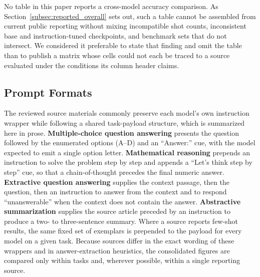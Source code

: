 No table in this paper reports a cross-model accuracy comparison. As
Section~\ref{subsec:reported_overall} sets out, such a table cannot be assembled
from current public reporting without mixing incompatible shot counts,
inconsistent base and instruction-tuned checkpoints, and benchmark sets that do
not intersect. We considered it preferable to state that finding and omit the
table than to publish a matrix whose cells could not each be traced to a source
evaluated under the conditions its column header claims.

\subsection{Prompt Formats}
\label{subsec:appendix_prompt_templates}
The reviewed source materials commonly preserve each model's own instruction
wrapper while following a shared task-payload structure, which is summarized here
in prose. \textbf{Multiple-choice question answering} presents the question
followed by the enumerated options (A--D) and an ``Answer:'' cue, with the model
expected to emit a single option letter. \textbf{Mathematical reasoning} prepends
an instruction to solve the problem step by step and appends a ``Let's think step
by step'' cue, so that a chain-of-thought precedes the final numeric answer.
\textbf{Extractive question answering} supplies the context passage, then the
question, then an instruction to answer from the context and to respond
``unanswerable'' when the context does not contain the answer. \textbf{Abstractive
summarization} supplies the source article preceded by an instruction to produce a
two- to three-sentence summary. Where a source reports few-shot results, the same
fixed set of exemplars is prepended to the payload for every model on a given
task. Because sources differ in the exact wording of these wrappers and in
answer-extraction heuristics, the consolidated figures are compared only within
tasks and, wherever possible, within a single reporting source.

